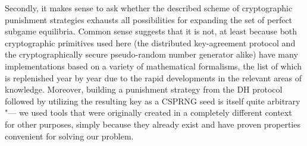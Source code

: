 Secondly, it makes sense to ask whether the described scheme of cryptographic punishment strategies exhausts all possibilities for expanding the set of perfect subgame equilibria. Common sense suggests that it is not, at least because both cryptographic primitives used here (the distributed key-agreement protocol and the cryptographically secure pseudo-random number generator alike) have many implementations based on a variety of mathematical formalisms, the list of which is replenished year by year due to the rapid developments in the relevant areas of knowledge. Moreover, building a punishment strategy from the DH protocol followed by utilizing the resulting key as a CSPRNG seed is itself quite arbitrary "--- we used tools that were originally created in a completely different context for other purposes, simply because they already exist and have proven properties convenient for solving our problem. %

